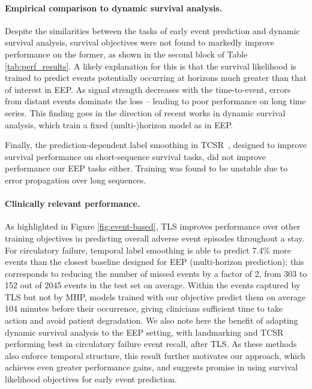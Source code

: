\documentclass[nohyperref]{article}
\begin{document}
\paragraph{Empirical comparison to dynamic survival analysis.} Despite the similarities between the tasks of early event prediction and dynamic survival analysis, survival objectives were not found to markedly improve performance on the former, as shown in the second block of Table \ref{tab:perf_results}. A likely explanation for this is that the survival likelihood is trained to predict events potentially occurring at horizons much greater than that of interest in EEP. As signal strength decreases with the time-to-event, errors from distant events dominate the loss -- leading to poor performance on long time series. This finding goes in the direction of recent works \cite{jarrett2019dynamic,lee2019dynamic} in dynamic survival analysis, which train a fixed (multi-)horizon model as in EEP. 


Finally, the prediction-dependent label smoothing in TCSR~\citep{Maystre2022}, designed to improve survival performance on short-sequence survival tasks, did not improve performance our EEP tasks either. Training was found to be unstable due to error propagation over long sequences.





\paragraph{Clinically relevant performance.} As highlighted in Figure \ref{fig:event-based}, TLS improves performance over other training objectives in predicting overall adverse event episodes throughout a stay. For circulatory failure, temporal label smoothing is able to predict 7.4\% more events than the closest baseline designed for EEP (multi-horizon prediction): this corresponds to reducing the number of missed events by a factor of 2, from 303 to 152 out of 2045 events in the test set on average. Within the events captured by TLS but not by MHP, models trained with our objective predict them on average 104 minutes before their occurrence, giving clinicians sufficient time to take action and avoid patient degradation. We also note here the benefit of adapting dynamic survival analysis to the EEP setting, with landmarking and TCSR performing best in circulatory failure event recall, after TLS. As these methods also enforce temporal structure, this result further motivates our approach, which achieves even greater performance gains, and suggests promise in using survival likelihood objectives for early event prediction. 
\end{document}

